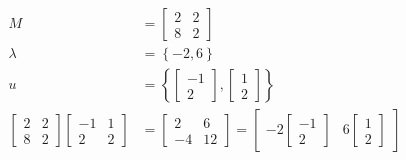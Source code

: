 \documentclass{article}
\begin{document}
\begin{equation}
    \begin{split}
        M & = \begin{bmatrix}
            2 & 2 \\ 8 & 2
        \end{bmatrix} \\
        \lambda & = \left\{ -2, 6 \right\} \\
        u & = \left\{ \begin{bmatrix}
            -1 \\ 2
        \end{bmatrix},  \begin{bmatrix}
            1 \\ 2
        \end{bmatrix} \right\} \\
        \begin{bmatrix}
            2 & 2 \\ 8 & 2
        \end{bmatrix}\begin{bmatrix}
            -1 & 1 \\ 2 & 2
        \end{bmatrix} & = \begin{bmatrix}
            2 & 6 \\ -4 & 12
        \end{bmatrix} = \begin{bmatrix}
            -2\begin{bmatrix}
            -1 \\ 2
        \end{bmatrix} & 6\begin{bmatrix}
            1 \\ 2
        \end{bmatrix}
        \end{bmatrix}
    \end{split}
\end{equation}

\clearpage

\end{document}
